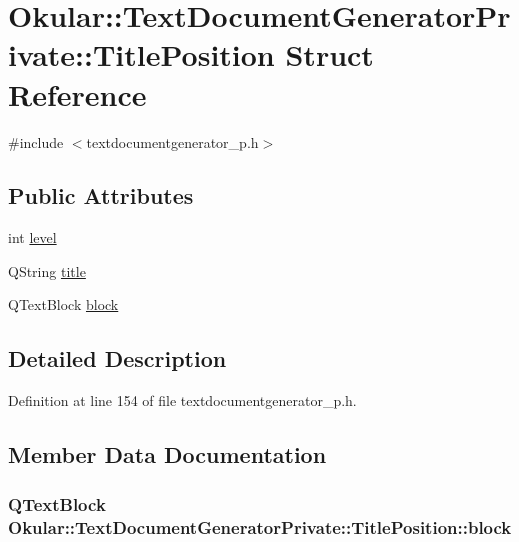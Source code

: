 \hypertarget{structOkular_1_1TextDocumentGeneratorPrivate_1_1TitlePosition}{\section{Okular\+:\+:Text\+Document\+Generator\+Private\+:\+:Title\+Position Struct Reference}
\label{structOkular_1_1TextDocumentGeneratorPrivate_1_1TitlePosition}
}


{\ttfamily \#include $<$textdocumentgenerator\+\_\+p.\+h$>$}

\subsection*{Public Attributes}
\begin{DoxyCompactItemize}
\item 
int \hyperlink{structOkular_1_1TextDocumentGeneratorPrivate_1_1TitlePosition_a3891ca8e5a5a2bee40c86c45c28580f2}{level}
\item 
Q\+String \hyperlink{structOkular_1_1TextDocumentGeneratorPrivate_1_1TitlePosition_a8e6e5b071bbeee14a07badecc0cd45d6}{title}
\item 
Q\+Text\+Block \hyperlink{structOkular_1_1TextDocumentGeneratorPrivate_1_1TitlePosition_a25adcdaa38cc3271a4a509d27e74bbda}{block}
\end{DoxyCompactItemize}


\subsection{Detailed Description}


Definition at line 154 of file textdocumentgenerator\+\_\+p.\+h.



\subsection{Member Data Documentation}
\hypertarget{structOkular_1_1TextDocumentGeneratorPrivate_1_1TitlePosition_a25adcdaa38cc3271a4a509d27e74bbda}{
\subsubsection[{block}]{\setlength{\rightskip}{0pt plus 5cm}Q\+Text\+Block Okular\+::\+Text\+Document\+Generator\+Private\+::\+Title\+Position\+::block}}\label{structOkular_1_1TextDocumentGeneratorPrivate_1_1TitlePosition_a25adcdaa38cc3271a4a509d27e74bbda}


